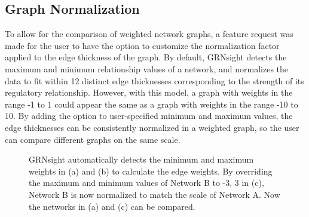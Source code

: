 \documentclass[sigconf,review]{acmart}
\begin{document}
\subsection{Graph Normalization}

To allow for the comparison of weighted network graphs, a feature request was made for the user to have 
the option to customize the normalization factor applied to the edge thickness of the graph. By default, 
GRNsight detects the maximum and minimum relationship values of a network, and normalizes the data to 
fit within 12 distinct edge thicknesses corresponding to the strength of its regulatory relationship. 
However, with this model, a graph with weights in the range -1 to 1 could appear the same as a graph 
with weights in the range -10 to 10. By adding the option to user-specified minimum and maximum values, 
the edge thicknesses can be consistently normalized in a weighted graph, so the user can compare 
different graphs on the same scale. 

\begin{figure}[h]
    \centering
    \caption{GRNsight automatically detects the minimum and maximum weights in (a) and (b) to calculate 
the edge weights. By overriding the maximum and minimum values of Network B to -3, 3 in (c), Network B 
is now normalized to match the scale of Network A. Now the networks in (a) and (c) can be compared.}
    \label{fig:network-screenshots}
\end{figure}
\end{document}
